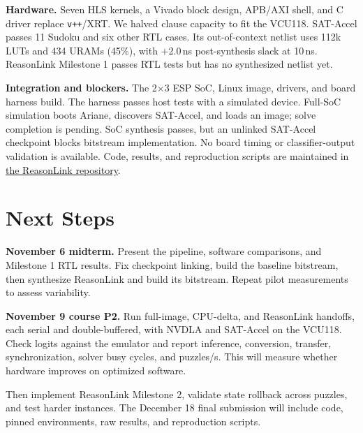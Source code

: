 \documentclass[conference,10pt,letterpaper]{IEEEtran}
\begin{document}
\textbf{Hardware.} Seven HLS kernels, a Vivado block design, APB/AXI shell, and C driver replace \texttt{v++}/XRT. We halved clause capacity to fit the VCU118. SAT-Accel passes 11 Sudoku and six other RTL cases. Its out-of-context netlist uses 112k LUTs and 434 URAMs (45\%), with $+$2.0\,ns post-synthesis slack at 10\,ns. ReasonLink Milestone 1 passes RTL tests but has no synthesized netlist yet.

\textbf{Integration and blockers.} The 2$\times$3 ESP SoC, Linux image, drivers, and board harness build. The harness passes host tests with a simulated device. Full-SoC simulation boots Ariane, discovers SAT-Accel, and loads an image; solve completion is pending. SoC synthesis passes, but an unlinked SAT-Accel checkpoint blocks bitstream implementation. No board timing or classifier-output validation is available. Code, results, and reproduction scripts are maintained in \href{https://github.com/AaronCherian404/ReasonLink}{the ReasonLink repository}.

\section{Next Steps}
\textbf{November 6 midterm.} Present the pipeline, software comparisons, and Milestone 1 RTL results. Fix checkpoint linking, build the baseline bitstream, then synthesize ReasonLink and build its bitstream. Repeat pilot measurements to assess variability.

\textbf{November 9 course P2.} Run full-image, CPU-delta, and ReasonLink handoffs, each serial and double-buffered, with NVDLA and SAT-Accel on the VCU118. Check logits against the emulator and report inference, conversion, transfer, synchronization, solver busy cycles, and puzzles/s. This will measure whether hardware improves on optimized software.

Then implement ReasonLink Milestone 2, validate state rollback across puzzles, and test harder instances. The December 18 final submission will include code, pinned environments, raw results, and reproduction scripts.

\clearpage


\end{document}
